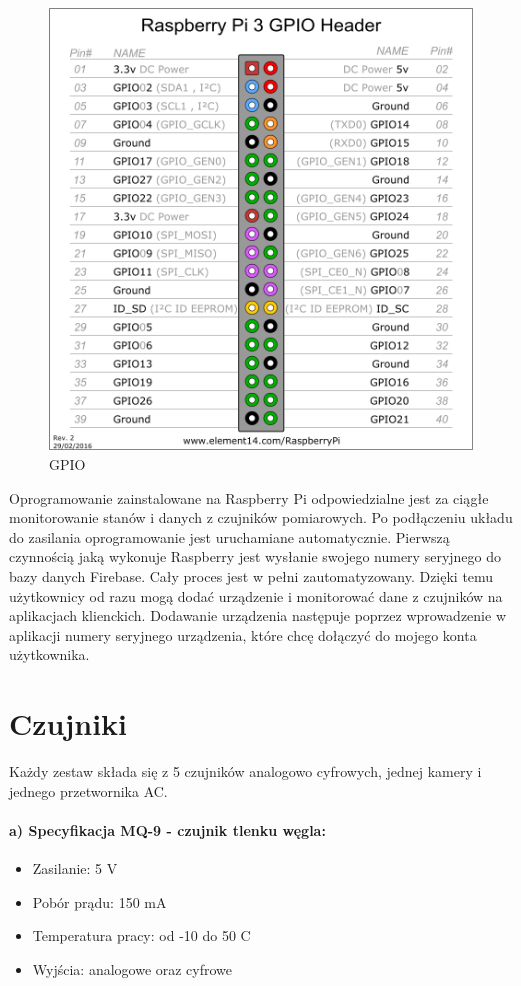 \begin{figure}[h]
\begin{minipage}[b]{0.4\textwidth}
    \includegraphics[width=\textwidth]{gpio.png}
    \caption{GPIO}
  \end{minipage}
\end{figure}

Oprogramowanie zainstalowane na Raspberry Pi odpowiedzialne jest za ciągłe monitorowanie stanów i danych z czujników pomiarowych. Po podłączeniu układu do zasilania oprogramowanie jest uruchamiane automatycznie. Pierwszą czynnością jaką wykonuje Raspberry jest wysłanie swojego numery seryjnego do bazy danych Firebase. Cały proces jest w pełni zautomatyzowany. Dzięki temu użytkownicy od razu mogą dodać urządzenie i monitorować dane z czujników na aplikacjach klienckich. Dodawanie urządzenia następuje poprzez wprowadzenie w aplikacji numery seryjnego urządzenia, które chcę dołączyć do mojego konta użytkownika.


\section*{Czujniki}

Każdy zestaw składa się z 5 czujników analogowo cyfrowych,  jednej kamery i jednego przetwornika AC. 
\paragraph{a) Specyfikacja MQ-9 - czujnik tlenku węgla:}
\begin{itemize} 
\item Zasilanie: 5 V
\item Pobór prądu: 150 mA
\item Temperatura pracy: od -10 do 50 \textdegree{}C
\item Wyjścia: analogowe oraz cyfrowe
\end{itemize}

